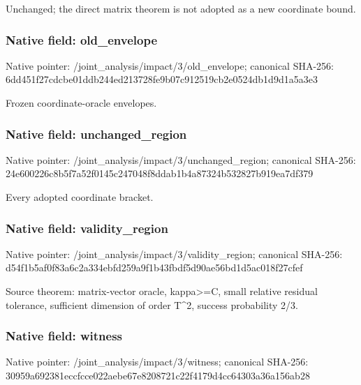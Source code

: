 \documentclass[10pt,a4paper]{article}
\begin{document}
\begingroup\raggedright\sloppy Unchanged;\allowbreak{} the direct matrix theorem is not adopted as a new coordinate bound.\par\endgroup

\subsubsection{Native field: old\_\allowbreak{}envelope}
Native pointer: /joint\_\allowbreak{}analysis/impact/3/old\_\allowbreak{}envelope; canonical SHA-256: 6dd451f27cdcbe01ddb244ed213728fe9b07c912519cb2e0524db1d9d1a5a3e3

\begingroup\raggedright\sloppy Frozen coordinate-oracle envelopes.\par\endgroup

\subsubsection{Native field: unchanged\_\allowbreak{}region}
Native pointer: /joint\_\allowbreak{}analysis/impact/3/unchanged\_\allowbreak{}region; canonical SHA-256: 24e600226c8b5f7a52f0145c247048f8ddab1b4a87324b532827b919ea7df379

\begingroup\raggedright\sloppy Every adopted coordinate bracket.\par\endgroup

\subsubsection{Native field: validity\_\allowbreak{}region}
Native pointer: /joint\_\allowbreak{}analysis/impact/3/validity\_\allowbreak{}region; canonical SHA-256: d54f1b5af0f83a6c2a334ebfd259a9f1b43fbdf5d90ae56bd1d5ac018f27cfef

\begingroup\raggedright\sloppy Source theorem:\allowbreak{} matrix-vector oracle,\allowbreak{} kappa>=\allowbreak{}C,\allowbreak{} small relative residual tolerance,\allowbreak{} sufficient dimension of order T\textasciicircum{}2,\allowbreak{} success probability 2/\allowbreak{}3.\par\endgroup

\subsubsection{Native field: witness}
Native pointer: /joint\_\allowbreak{}analysis/impact/3/witness; canonical SHA-256: 30959a692381eccfcce022aebe67e8208721c22f4179d4cc64303a36a156ab28
\end{document}

